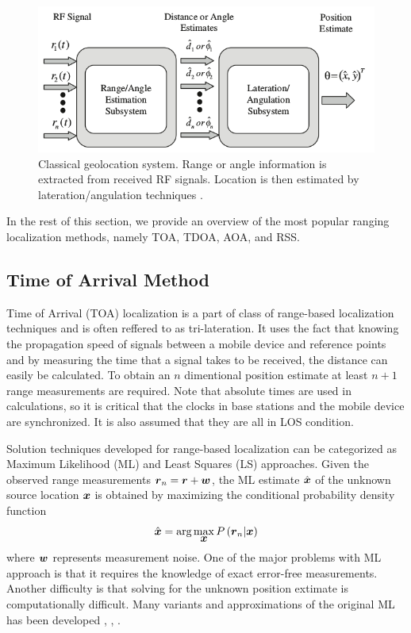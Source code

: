 \begin{figure}[h]
\centering
\includegraphics[width=1.0\textwidth]{figures/localization_example.png}
\caption{Classical geolocation system. Range or angle information is extracted from received RF signals. Location is then estimated by lateration/angulation techniques \cite{GeoLoc}.}
\label{fig:2step}
\end{figure}


In the rest of this section, we  provide an overview of the most popular ranging localization methods, namely  TOA, TDOA, AOA, and RSS.



\subsection{Time of Arrival Method}

Time of Arrival (TOA) localization is a part of class of range-based localization techniques and is often reffered to as tri-lateration. It uses the fact that knowing the propagation speed of  signals between a mobile device and reference points and by measuring the time that a signal takes to be received, the distance can easily be calculated. To obtain an $n$  dimentional position estimate at least $n+1$ range measurements are required. Note that absolute times are used in calculations, so it is critical that the  clocks in base stations and the mobile device are synchronized. It is also assumed that they are all in LOS condition. %

Solution techniques developed for range-based localization can be categorized as Maximum Likelihood (ML) and Least Squares (LS) approaches. 
Given the observed range measurements $\mbox{\boldmath$r$}_n = \mbox{\boldmath$r$} + \mbox{\boldmath$w$}$, the ML estimate $\hat{\mbox{\boldmath$x$}}$ of the unknown source location $\mbox{\boldmath$x$}$ is obtained by maximizing the conditional probability density function 
\begin{equation}
\nonumber
\hat{\mbox{\boldmath$x$}} = \mbox{arg}\max_{\mbox{\boldmath$x$}} P\left(\mbox{\boldmath$r$}_n|\mbox{\boldmath$x$}\right)
\end{equation}
where $\mbox{\boldmath$w$}$ represents measurement noise. One of the major problems with ML approach is that it requires the knowledge of exact error-free measurements. Another difficulty is that solving for the unknown position extimate is computationally difficult. Many variants and approximations of the original ML has been  developed \cite{HoML}, \cite{Guvenc2}, \cite{Guvenc}.

